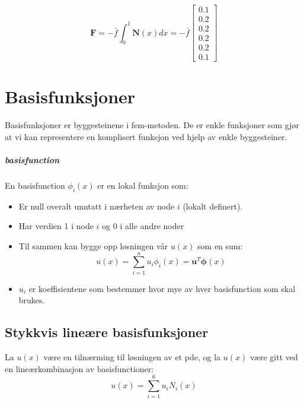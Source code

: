 \begin{equation*}
  \symbf{F} = - \bar{f} \int_0^1 \symbf{N}(x) dx = - \bar{f} \begin{bmatrix}
    0.1 \\ 0.2 \\ 0.2 \\ 0.2 \\ 0.2 \\ 0.1
  \end{bmatrix}
\end{equation*}


\section{Basisfunksjoner}

Basisfunksjoner er byggesteinene i \gls{fem}-metoden.
De er enkle funksjoner som gjør at vi kan representere en komplisert funksjon ved hjelp av enkle byggesteiner.

\subparagraph{\gls{basisfunction}}
En \gls{basisfunction} $\phi_i(x)$ er en lokal funksjon som:
\begin{itemize}
  \item Er null overalt unntatt i nærheten av node \(i\) (lokalt definert).
  \item Har verdien 1 i node \(i\) og 0 i alle andre noder
  \item Til sammen kan bygge opp løsningen vår \(u(x)\) som en sum:
        \[
          u(x) = \sum_{i=1}^n u_i \phi_i(x) = \symbf{u}^T \symbf{\phi}(x)
        \]
  \item \(u_i\) er koeffisientene som bestemmer hvor mye av hver \gls{basisfunction} som skal brukes.
\end{itemize}


\subsection{Stykkvis lineære basisfunksjoner}

La \(u(x)\) være en tilnærming til løsningen av et \gls{pde}, og la \(u(x)\) være gitt ved en lineærkombinasjon av \gls{basisfunction}er:
\[
  u(x) = \sum_{i=1}^6 u_i N_i(x)
\]


